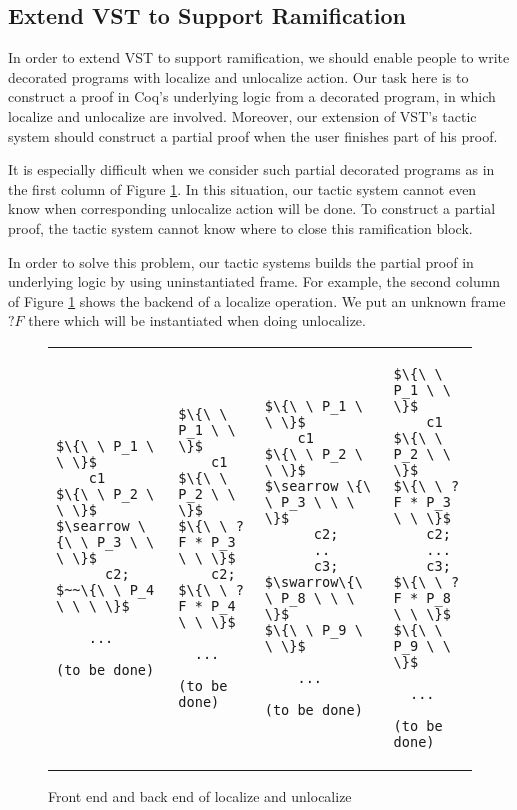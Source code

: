 \subsection{Extend VST to Support Ramification}

In order to extend VST to support ramification, we should enable people to write decorated programs with localize and unlocalize action. Our task here is to construct a proof in Coq's underlying logic from a decorated program, in which localize and unlocalize are involved. Moreover, our extension of VST's tactic system should construct a partial proof when the user finishes part of his proof.

It is especially difficult when we consider such partial decorated programs as in the first column of Figure \ref{figure:backend}. In this situation, our tactic system cannot even know when corresponding unlocalize action will be done. To construct a partial proof, the tactic system cannot know where to close this ramification block.

In order to solve this problem, our tactic systems builds the partial proof in underlying logic by using uninstantiated frame. For example, the second column of Figure \ref{figure:backend} shows the backend of a localize operation. We put an unknown frame $?F$ there which will be instantiated when doing unlocalize.

\lstset{numbers=none}

\begin{figure}[h]
\begin{tabular}{l | l | l | l}
\begin{lstlisting}
$\{\ \ P_1 \ \ \}$
    c1
$\{\ \ P_2 \ \ \}$
$\searrow \{\ \ P_3 \ \ \ \}$
      c2;
$~~\{\ \ P_4 \ \ \ \}$

    ...

(to be done)

\end{lstlisting} & \begin{lstlisting}
$\{\ \ P_1 \ \ \}$
    c1
$\{\ \ P_2 \ \ \}$
$\{\ \ ?F * P_3 \ \ \}$
    c2;
$\{\ \ ?F * P_4 \ \ \}$

  ...

(to be done)

\end{lstlisting} & \begin{lstlisting}
$\{\ \ P_1 \ \ \}$
    c1
$\{\ \ P_2 \ \ \}$
$\searrow \{\ \ P_3 \ \ \ \}$
      c2;
      ..
      c3;
$\swarrow\{\ \ P_8 \ \ \ \}$
$\{\ \ P_9 \ \ \}$

    ...

(to be done)
\end{lstlisting} & \begin{lstlisting}
$\{\ \ P_1 \ \ \}$
    c1
$\{\ \ P_2 \ \ \}$
$\{\ \ ?F * P_3 \ \ \}$
    c2;
    ...
    c3;
$\{\ \ ?F * P_8 \ \ \}$
$\{\ \ P_9 \ \ \}$

  ...

(to be done)
\end{lstlisting}
\end{tabular}
\caption{Front end and back end of localize and unlocalize}
\label{figure:backend}
\end{figure}


